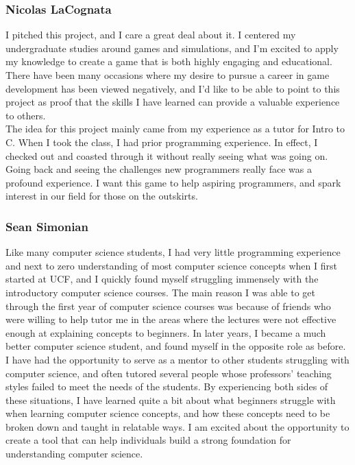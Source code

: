 \subsubsection{Nicolas LaCognata}
I pitched this project, and I care a great deal about it. I centered my
undergraduate studies around games and simulations, and I’m excited to apply my
knowledge to create a game that is both highly engaging and educational. There
have been many occasions where my desire to pursue a career in game development
has been viewed negatively, and I’d like to be able to point to this project as
proof that the skills I have learned can provide a valuable experience to
others.\\

The idea for this project mainly came from my experience as a tutor for Intro to
C. When I took the class, I had prior programming experience. In effect, I
checked out and coasted through it without really seeing what was going on.
Going back and seeing the challenges new programmers really face was a profound
experience. I want this game to help aspiring programmers, and spark interest in
our field for those on the outskirts.

\subsubsection{Sean Simonian}
Like many computer science students, I had very little programming experience
and next to zero understanding of most computer science concepts when I first
started at UCF, and I quickly found myself struggling immensely with the
introductory computer science courses. The main reason I was able to get through
the first year of computer science courses was because of friends who were
willing to help tutor me in the areas where the lectures were not effective
enough at explaining concepts to beginners. In later years, I became a much
better computer science student, and found myself in the opposite role as
before. I have had the opportunity to serve as a mentor to other students
struggling with computer science, and often tutored several people whose
professors’ teaching styles failed to meet the needs of the students. By
experiencing both sides of these situations, I have learned quite a bit about
what beginners struggle with when learning computer science concepts, and how
these concepts need to be broken down and taught in relatable ways. I am excited
about the opportunity to create a tool that can help individuals build a strong
foundation for understanding computer science.\\

